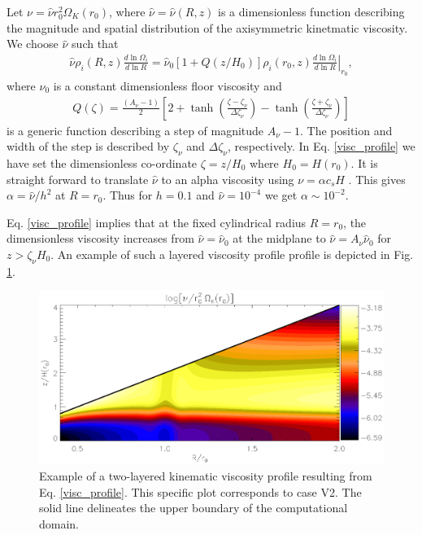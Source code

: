Let $\nu = \hat{\nu}r_0^2\Omega_K(r_0)$, where
$\hat{\nu}=\hat{\nu}(R,z)$ is a dimensionless function describing
the magnitude and spatial distribution of the axisymmetric kinetmatic
viscosity. We choose $\hat{\nu}$ such that   
\begin{align}\label{visc_profile}
  \hat{\nu}\rho_i(R,z)\frac{d\ln{\Omega_i}}{d\ln{R}} =
  \hat{\nu}_0\left[1+Q(z/H_0)\right]\rho_i(r_0,z)\left.\frac{d\ln{\Omega_i}}{d\ln{R}}\right|_{r_0}, 
\end{align}
where $\nu_0$ is a constant dimensionless floor viscosity and   
\begin{align}\label{step}
  Q(\zeta) = \frac{\left(A_\nu - 1\right)}{2}
  \left[  2 + \tanh{\left(\frac{\zeta - \zeta_\nu}{\Delta\zeta_\nu}\right)}
    - \tanh{\left(\frac{\zeta +
        \zeta_\nu}{\Delta\zeta_\nu}\right)}\right]
\end{align}
is a generic function describing a step of magnitude
$A_\nu-1$. The position and width of the step is described by
$\zeta_\nu$ and $\Delta\zeta_\nu$, respectively. 
In Eq. \ref{visc_profile} we have set the dimensionless co-ordinate
$\zeta=z/H_0$ where $H_0=H(r_0)$. %
It is straight forward to
translate $\hat{\nu}$ to an alpha viscosity 
using $\nu = \alpha c_s H$ \citep{shakura73}. This gives $\alpha =
\hat{\nu}/h^2$ at $R=r_0$.  Thus for $h=0.1$ and $\hat{\nu}=10^{-4}$ we
get $\alpha\sim 10^{-2}$.  

Eq. \ref{visc_profile} implies that at the fixed cylindrical radius
$R=r_0$, the dimensionless viscosity increases from $\hat{\nu} =
\hat{\nu}_0$ at the midplane to $\hat{\nu} = A_\nu\hat{\nu}_0$ for
$z > \zeta_\nu H_0$. An example of such a layered viscosity profile
profile is depicted in Fig. \ref{visc2d}. 
 

\begin{figure}
  \centering
  \includegraphics[width=\linewidth]{figures/pdisk_visc2d_layer2}
  \caption{Example of a two-layered kinematic viscosity profile
    resulting from Eq. \ref{visc_profile}. This specific plot
    corresponds to case V2. The solid line
    delineates the upper boundary of the computational domain.
    \label{visc2d}}
\end{figure}



